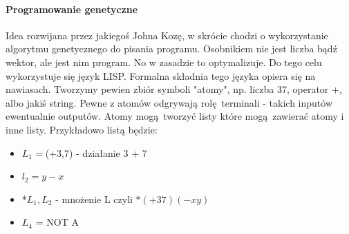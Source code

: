 \documentclass{article}
\begin{document}
		\paragraph{Programowanie genetyczne} Idea rozwijana przez jakiegoś Johna Kozę, w skrócie chodzi o wykorzystanie algorytmu genetycznego do pisania programu. Osobnikiem nie jest liczba bądź wektor, ale jest nim program. No w zasadzie to optymalizuje. Do tego celu wykorzystuje się język LISP. Formalna składnia tego języka opiera się na nawiasach. Tworzymy pewien zbiór symboli "atomy", np. liczba 37, operator +, albo jakiś string. Pewne z atomów odgrywają rolę terminali - takich inputów ewentualnie outputów. Atomy mogą tworzyć listy które mogą zawierać atomy i inne listy. Przykładowo listą będzie:
		\begin{itemize}
			\item $L_1 =$(+3,7) - działanie 3 + 7
			\item $l_2 = y -x$
			\item *$L_1, L_2$ - mnożenie L czyli $*(+37)(-xy)$
			\item $L_4$ = NOT A
		\end{itemize}
		
\end{document}
